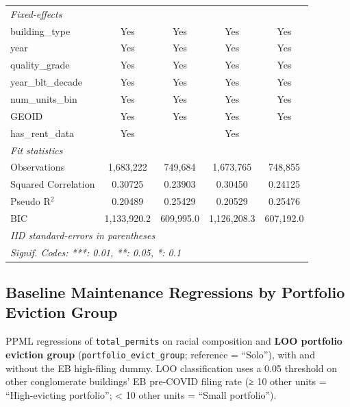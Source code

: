 \documentclass[
  11pt,
]{article}
\begin{document}
\begin{center}
{\begin{tabular}{lcccc}
   \midrule
   \emph{Fixed-effects}\\
   building\_type                            & Yes            & Yes            & Yes            & Yes\\  
   year                                      & Yes            & Yes            & Yes            & Yes\\  
   quality\_grade                            & Yes            & Yes            & Yes            & Yes\\  
   year\_blt\_decade                         & Yes            & Yes            & Yes            & Yes\\  
   num\_units\_bin                           & Yes            & Yes            & Yes            & Yes\\  
   GEOID                                     & Yes            & Yes            & Yes            & Yes\\  
   has\_rent\_data                           & Yes            &                & Yes            & \\  
   \midrule
   \emph{Fit statistics}\\
   Observations                              & 1,683,222      & 749,684        & 1,673,765      & 748,855\\  
   Squared Correlation                       & 0.30725        & 0.23903        & 0.30450        & 0.24125\\  
   Pseudo R$^2$                              & 0.20489        & 0.25429        & 0.20529        & 0.25476\\  
   BIC                                       & 1,133,920.2    & 609,995.0      & 1,126,208.3    & 607,192.0\\  
   \midrule \midrule
   \multicolumn{5}{l}{\emph{IID standard-errors in parentheses}}\\
   \multicolumn{5}{l}{\emph{Signif. Codes: ***: 0.01, **: 0.05, *: 0.1}}\\
\end{tabular}
}
\end{center}

\subsection{Baseline Maintenance Regressions by Portfolio Eviction
Group}\label{baseline-maintenance-regressions-by-portfolio-eviction-group}

PPML regressions of \texttt{total\_permits} on racial composition and
\textbf{LOO portfolio eviction group} (\texttt{portfolio\_evict\_group};
reference = ``Solo''), with and without the EB high-filing dummy. LOO
classification uses a 0.05 threshold on other conglomerate buildings' EB
pre-COVID filing rate (≥ 10 other units = ``High-evicting portfolio'';
\textless{} 10 other units = ``Small portfolio'').
\end{document}
